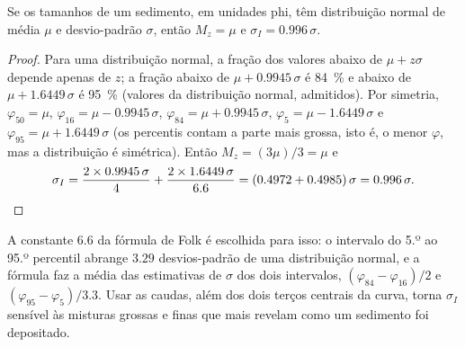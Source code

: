 \begin{proposition}\label{prop:b1:clastic-sediments:normal}
Se os tamanhos de um sedimento, em unidades phi, têm distribuição normal de média $\mu$ e desvio-padrão $\sigma$, então $M_z = \mu$ e $\sigma_I = 0.996\,\sigma$.
\end{proposition}

\begin{proof}
Para uma distribuição normal, a fração dos valores abaixo de $\mu + z\sigma$ depende apenas de $z$; a fração abaixo de $\mu + 0.9945\,\sigma$ é \qty{84}{\percent} e abaixo de $\mu + 1.6449\,\sigma$ é \qty{95}{\percent} (valores da distribuição normal, admitidos). Por simetria, $\varphi_{50} = \mu$, $\varphi_{16} = \mu -
0.9945\,\sigma$, $\varphi_{84} = \mu + 0.9945\,\sigma$, $\varphi_5 = \mu -
1.6449\,\sigma$ e $\varphi_{95} = \mu + 1.6449\,\sigma$ (os percentis contam a parte mais grossa, isto é, o menor $\varphi$, mas a distribuição é simétrica). Então $M_z = (3\mu)/3 = \mu$ e
\[
  \sigma_I = \frac{2 \times 0.9945\,\sigma}{4} + \frac{2 \times 1.6449\,\sigma}{6.6}
  = (0.4972 + 0.4985)\,\sigma = 0.996\,\sigma. \qedhere
\]
\end{proof}

A constante 6.6 da fórmula de Folk é escolhida para isso: o intervalo do 5.º ao 95.º percentil abrange $3.29$ desvios-padrão de uma distribuição normal, e a fórmula faz a média das estimativas de $\sigma$ dos dois intervalos, $(\varphi_{84}-\varphi_{16})/2$ e $(\varphi_{95}-\varphi_5)/3.3$. Usar as caudas, além dos dois terços centrais da curva, torna $\sigma_I$ sensível às misturas grossas e finas que mais revelam como um sedimento foi depositado.

